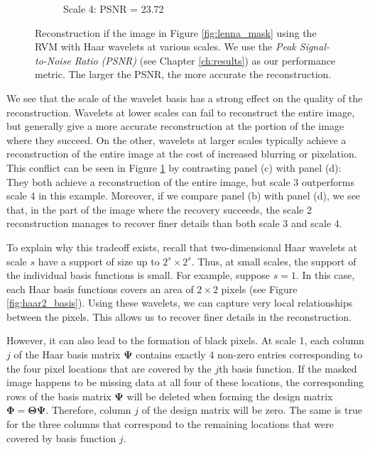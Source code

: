 \begin{figure}
\begin{subfigure}{0.4\textwidth}
    \caption{Scale 4: PSNR = 23.72}
  \end{subfigure}  
  \caption[Reconstruction of masked image signals using Haar wavelets at various scales]{Reconstruction if the image in Figure \ref{fig:lenna_mask} using the RVM with Haar wavelets at various scales.
    We use the \emph{Peak Signal-to-Noise Ratio (PSNR)} (see Chapter \ref{ch:results}) as our performance metric. The larger the PSNR, the more accurate the reconstruction.}
  \label{fig:lenna_rvm}
\end{figure}

We see that the scale of the wavelet basis has a strong effect on the quality of the reconstruction.
Wavelets at lower scales can fail to reconstruct the entire image, but generally give a more accurate reconstruction at the portion of the image where they succeed.
On the other, wavelets at larger scales typically achieve a reconstruction of the entire image at the cost of increased blurring or pixelation.
This conflict can be seen in Figure \ref{fig:lenna_rvm} by contrasting panel (c) with panel (d):
They both achieve a reconstruction of the entire image, but scale 3 outperforms scale 4 in this example.
Moreover, if we compare panel (b) with panel (d), we see that, in the part of the image where the recovery succeeds, the scale 2 reconstruction manages to recover finer details than both scale 3 and scale 4.

To explain why this tradeoff exists, recall that two-dimensional Haar wavelets at scale $s$ have a support of size up to $2^s\times 2^s$.
Thus, at small scales, the support of the individual basis functions is small.
For example, suppose $s=1$.
In this case, each Haar basis functions covers an area of $2\times 2$ pixels (see Figure \ref{fig:haar2_basis}).
Using these wavelets, we can capture very local relationships between the pixels.
This allows us to recover finer details in the reconstruction.

However, it can also lead to the formation of black pixels.
At scale 1, each column $j$ of the Haar basis matrix $\bm \Psi$ contains exactly 4 non-zero entries corresponding to the four pixel locations that are covered by the $j$th basis function.
If the masked image happens to be missing data at all four of these locations, the corresponding rows of the basis matrix $\bm\Psi$ will be deleted when forming the design matrix $\bm\Phi=\bm\Theta\bm\Psi$.
Therefore, column $j$ of the design matrix will be zero.
The same is true for the three columns that correspond to the remaining locations that were covered by basis function $j$.

